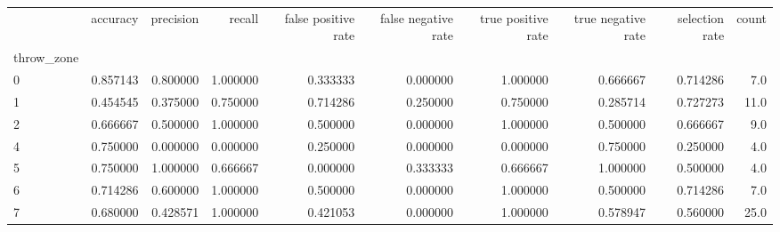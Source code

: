 \begin{tabular}{lrrrrrrrrr}
\toprule
{} &  accuracy &  precision &    recall &  false positive rate &  false negative rate &  true positive rate &  true negative rate &  selection rate &  count \\
throw\_zone &           &            &           &                      &                      &                     &                     &                 &        \\
\midrule
0          &  0.857143 &   0.800000 &  1.000000 &             0.333333 &             0.000000 &            1.000000 &            0.666667 &        0.714286 &    7.0 \\
1          &  0.454545 &   0.375000 &  0.750000 &             0.714286 &             0.250000 &            0.750000 &            0.285714 &        0.727273 &   11.0 \\
2          &  0.666667 &   0.500000 &  1.000000 &             0.500000 &             0.000000 &            1.000000 &            0.500000 &        0.666667 &    9.0 \\
4          &  0.750000 &   0.000000 &  0.000000 &             0.250000 &             0.000000 &            0.000000 &            0.750000 &        0.250000 &    4.0 \\
5          &  0.750000 &   1.000000 &  0.666667 &             0.000000 &             0.333333 &            0.666667 &            1.000000 &        0.500000 &    4.0 \\
6          &  0.714286 &   0.600000 &  1.000000 &             0.500000 &             0.000000 &            1.000000 &            0.500000 &        0.714286 &    7.0 \\
7          &  0.680000 &   0.428571 &  1.000000 &             0.421053 &             0.000000 &            1.000000 &            0.578947 &        0.560000 &   25.0 \\
\bottomrule
\end{tabular}
